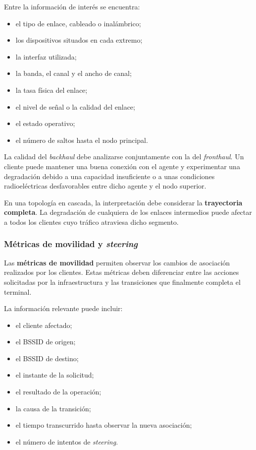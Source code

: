 Entre la información de interés se encuentra:

\begin{itemize}
    \item el tipo de enlace, cableado o inalámbrico;
    \item los dispositivos situados en cada extremo;
    \item la interfaz utilizada;
    \item la banda, el canal y el ancho de canal;
    \item la tasa física del enlace;
    \item el nivel de señal o la calidad del enlace;
    \item el estado operativo;
    \item el número de saltos hasta el nodo principal.
\end{itemize}

La calidad del \textit{backhaul} debe analizarse conjuntamente con la del
\textit{fronthaul}. Un cliente puede mantener una buena conexión con el
agente y experimentar una degradación debido a una capacidad insuficiente
o a unas condiciones radioeléctricas desfavorables entre dicho agente y
el nodo superior.

En una topología en cascada, la interpretación debe considerar la
\textbf{trayectoria completa}. La degradación de cualquiera de los
enlaces intermedios puede afectar a todos los clientes cuyo tráfico
atraviesa dicho segmento.

\subsubsection*{Métricas de movilidad y \textit{steering}}

Las \textbf{métricas de movilidad} permiten observar los cambios de
asociación realizados por los clientes. Estas métricas deben diferenciar
entre las acciones solicitadas por la infraestructura y las transiciones
que finalmente completa el terminal.

La información relevante puede incluir:

\begin{itemize}
    \item el cliente afectado;
    \item el BSSID de origen;
    \item el BSSID de destino;
    \item el instante de la solicitud;
    \item el resultado de la operación;
    \item la causa de la transición;
    \item el tiempo transcurrido hasta observar la nueva asociación;
    \item el número de intentos de \textit{steering}.
\end{itemize}

